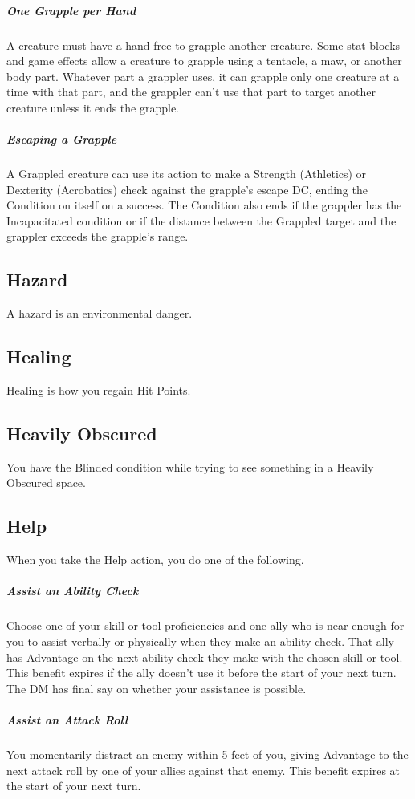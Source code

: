 \documentclass[10pt,a4paper,twoside,bg=print,twocolumn,openany,nodeprecatedcode]{dndarticle}
\begin{document}
\subparagraph{One Grapple per Hand}
A creature must have a hand free to grapple another creature. Some stat blocks and game effects allow a creature to grapple using a tentacle, a maw, or another body part. Whatever part a grappler uses, it can grapple only one creature at a time with that part, and the grappler can't use that part to target another creature unless it ends the grapple.

\subparagraph{Escaping a Grapple}
A Grappled creature can use its action to make a Strength (Athletics) or Dexterity (Acrobatics) check against the grapple's escape DC, ending the Condition on itself on a success. The Condition also ends if the grappler has the Incapacitated condition or if the distance between the Grappled target and the grappler exceeds the grapple's range.

\subsection{Hazard}
A hazard is an environmental danger.

\subsection{Healing}
Healing is how you regain Hit Points.

\subsection{Heavily Obscured}
You have the Blinded condition while trying to see something in a Heavily Obscured space.

\subsection{Help}
When you take the Help action, you do one of the following.

\subparagraph{Assist an Ability Check}
Choose one of your skill or tool proficiencies and one ally who is near enough for you to assist verbally or physically when they make an ability check. That ally has Advantage on the next ability check they make with the chosen skill or tool. This benefit expires if the ally doesn't use it before the start of your next turn. The DM has final say on whether your assistance is possible.

\subparagraph{Assist an Attack Roll}
You momentarily distract an enemy within 5 feet of you, giving Advantage to the next attack roll by one of your allies against that enemy. This benefit expires at the start of your next turn.
\end{document}

